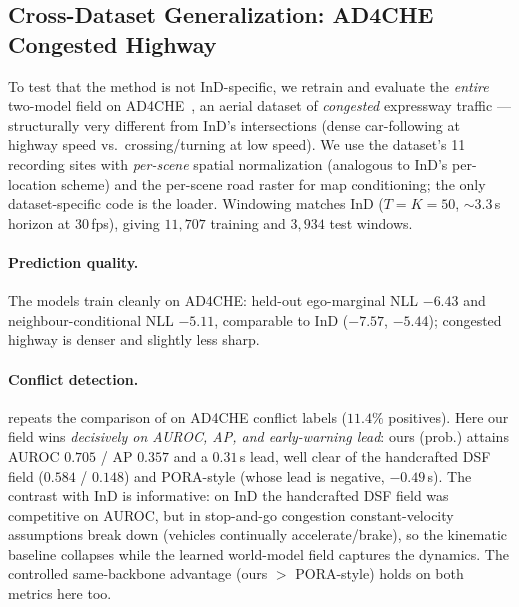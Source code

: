 \documentclass[journal]{IEEEtran}
\begin{document}
\subsection{Cross-Dataset Generalization: AD4CHE Congested Highway}\label{sec:results_ad4che}
To test that the method is not InD-specific, we retrain and evaluate the \emph{entire} two-model field on AD4CHE~\cite{zhang2023ad4che}, an aerial dataset of \emph{congested} expressway traffic --- structurally very different from InD's intersections (dense car-following at highway speed vs.\ crossing/turning at low speed). We use the dataset's 11 recording sites with \emph{per-scene} spatial normalization (analogous to InD's per-location scheme) and the per-scene road raster for map conditioning; the only dataset-specific code is the loader. Windowing matches InD ($T{=}K{=}50$, ${\sim}3.3$\,s horizon at 30\,fps), giving $11{,}707$ training and $3{,}934$ test windows.

\paragraph{Prediction quality.} The models train cleanly on AD4CHE: held-out ego-marginal NLL $-6.43$ and neighbour-conditional NLL $-5.11$, comparable to InD ($-7.57$, $-5.44$); congested highway is denser and slightly less sharp.

\paragraph{Conflict detection.}  repeats the comparison of  on AD4CHE conflict labels ($11.4\%$ positives). Here our field wins \emph{decisively on AUROC, AP, and early-warning lead}: ours (prob.) attains AUROC $\mathbf{0.705}$ / AP $\mathbf{0.357}$ and a $0.31$\,s lead, well clear of the handcrafted DSF field ($0.584$ / $0.148$) and PORA-style (whose lead is negative, $-0.49$\,s). The contrast with InD is informative: on InD the handcrafted DSF field was competitive on AUROC, but in stop-and-go congestion constant-velocity assumptions break down (vehicles continually accelerate/brake), so the kinematic baseline collapses while the learned world-model field captures the dynamics. The controlled same-backbone advantage (ours $>$ PORA-style) holds on both metrics here too.
\end{document}
